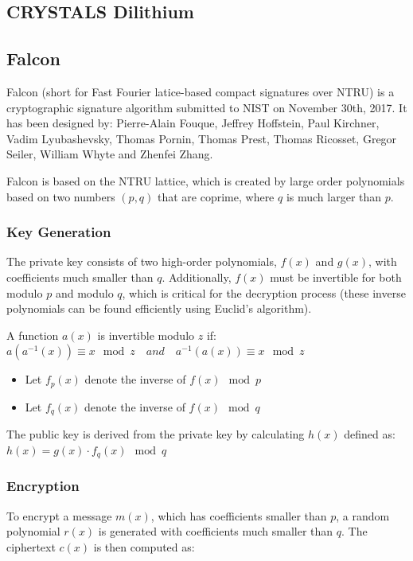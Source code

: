 \documentclass{article}
\begin{document}
\subsection{CRYSTALS Dilithium}
\subsection{Falcon}
Falcon (short for Fast Fourier latice-based compact signatures over NTRU) is a
cryptographic signature algorithm submitted to NIST on November 30th, 2017. It
has been designed by: Pierre-Alain Fouque, Jeffrey Hoffstein, Paul Kirchner,
Vadim Lyubashevsky, Thomas Pornin, Thomas Prest, Thomas Ricosset, Gregor
Seiler, William Whyte and Zhenfei Zhang.

\medskip
Falcon is based on the NTRU lattice, which is created by large order
polynomials based on two numbers $(p,q)$ that are coprime, where $q$ is much larger
than $p$.

\subsubsection{Key Generation}

The private key consists of two high-order polynomials, $f(x)$ and $g(x)$, with
coefficients much smaller than $q$. Additionally, $f(x)$ must be invertible for
both modulo $p$ and modulo $q$, which is critical for the decryption process (these
inverse polynomials can be found efficiently using Euclid's algorithm).

A function $a(x)$ is invertible modulo $z$ if:\\
$a(a^{-1}(x)) \equiv x \mod{z} \quad and \quad a^{-1}(a(x)) \equiv x \mod{z}$
\\
\begin{itemize}
   \item Let $f_{p}(x)$ denote the inverse of $f(x) \mod{p}$
   \item Let $f_{q}(x)$ denote the inverse of $f(x) \mod{q}$
\end{itemize}
The public key is derived from the private key by calculating $h(x)$ defined as:\\
$h(x) = g(x) \cdot f_{q}(x) \mod{q}$

\subsubsection{Encryption}
To encrypt a message $m(x)$, which has coefficients smaller than $p$, a random
polynomial $r(x)$ is generated with coefficients much smaller than $q$. The
ciphertext $c(x)$ is then computed as:\\
\end{document}
